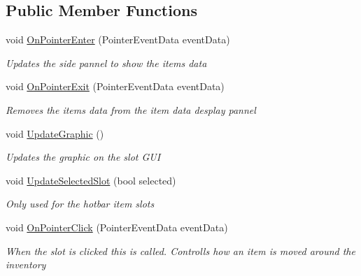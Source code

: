 \subsection*{Public Member Functions}
\begin{DoxyCompactItemize}
\item 
void \hyperlink{class_bee_game_1_1_inventory_1_1_inventory_slot_a471790f0d1eb55a483b0a530c6371c09}{On\+Pointer\+Enter} (Pointer\+Event\+Data event\+Data)
\begin{DoxyCompactList}\small\item\em Updates the side pannel to show the items data \end{DoxyCompactList}\item 
void \hyperlink{class_bee_game_1_1_inventory_1_1_inventory_slot_a13a4046ae2c80a52f3b1ed44fc1a5ef1}{On\+Pointer\+Exit} (Pointer\+Event\+Data event\+Data)
\begin{DoxyCompactList}\small\item\em Removes the items data from the item data desplay pannel \end{DoxyCompactList}\item 
void \hyperlink{class_bee_game_1_1_inventory_1_1_inventory_slot_abe33997cbde05772253494f20f949483}{Update\+Graphic} ()
\begin{DoxyCompactList}\small\item\em Updates the graphic on the slot G\+UI \end{DoxyCompactList}\item 
void \hyperlink{class_bee_game_1_1_inventory_1_1_inventory_slot_adc03a9101c901f82a3dfc778db98cf1f}{Update\+Selected\+Slot} (bool selected)
\begin{DoxyCompactList}\small\item\em Only used for the hotbar item slots \end{DoxyCompactList}\item 
void \hyperlink{class_bee_game_1_1_inventory_1_1_inventory_slot_a582545a412e4b746be55d36a11e61e96}{On\+Pointer\+Click} (Pointer\+Event\+Data event\+Data)
\begin{DoxyCompactList}\small\item\em When the slot is clicked this is called. Controlls how an item is moved around the inventory \end{DoxyCompactList}\end{DoxyCompactItemize}
